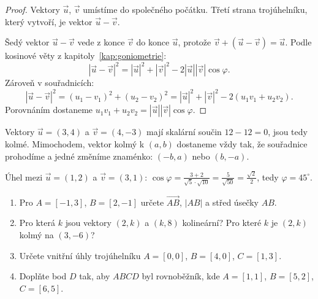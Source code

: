 \begin{proof}
  Vektory $\vec{u}$, $\vec{v}$ umístíme do společného počátku. Třetí strana trojúhelníku, který vytvoří, je vektor $\vec{u} - \vec{v}$.
  \begin{center}
  \end{center}
  Šedý vektor $\vec{u} - \vec{v}$ vede z konce $\vec{v}$ do konce $\vec{u}$, protože $\vec{v} + (\vec{u} - \vec{v}) = \vec{u}$. Podle kosinové věty z kapitoly~\ref{kap:goniometrie}:
  \begin{equation*}
    |\vec{u} - \vec{v}|^2 = |\vec{u}|^2 + |\vec{v}|^2 - 2|\vec{u}||\vec{v}|\cos\varphi.
  \end{equation*}
  Zároveň v souřadnicích:
  \begin{equation*}
    |\vec{u} - \vec{v}|^2 = {(u_1 - v_1)}^2 + {(u_2 - v_2)}^2 = |\vec{u}|^2 + |\vec{v}|^2 - 2(u_1v_1 + u_2v_2).
  \end{equation*}
  Porovnáním dostaneme $u_1v_1 + u_2v_2 = |\vec{u}||\vec{v}|\cos\varphi$.
\end{proof}

\begin{example}
  Vektory $\vec{u} = (3, 4)$ a $\vec{v} = (4, -3)$ mají skalární součin $12 - 12 = 0$, jsou tedy kolmé. Mimochodem, vektor kolmý k $(a, b)$ dostaneme vždy tak, že souřadnice prohodíme a jedné změníme znaménko: $(-b, a)$ nebo $(b, -a)$.

  Úhel mezi $\vec{u} = (1, 2)$ a $\vec{v} = (3, 1)$: $\cos\varphi = \frac{3 + 2}{\sqrt{5}\cdot\sqrt{10}} = \frac{5}{\sqrt{50}} = \frac{\sqrt{2}}{2}$, tedy $\varphi = 45^\circ$.
\end{example}

\begin{problem}
  \begin{enumerate}[label=(\alph*)]
    \item Pro $A = [-1, 3]$, $B = [2, -1]$ určete $\overrightarrow{AB}$, $|AB|$ a střed úsečky $AB$.
    \item Pro která $k$ jsou vektory $(2, k)$ a $(k, 8)$ kolineární? Pro které $k$ je $(2, k)$ kolmý na $(3, -6)$?
    \item Určete vnitřní úhly trojúhelníku $A = [0, 0]$, $B = [4, 0]$, $C = [1, 3]$.
    \item Doplňte bod $D$ tak, aby $ABCD$ byl rovnoběžník, kde $A = [1, 1]$, $B = [5, 2]$, $C = [6, 5]$.
  \end{enumerate}
\end{problem}


